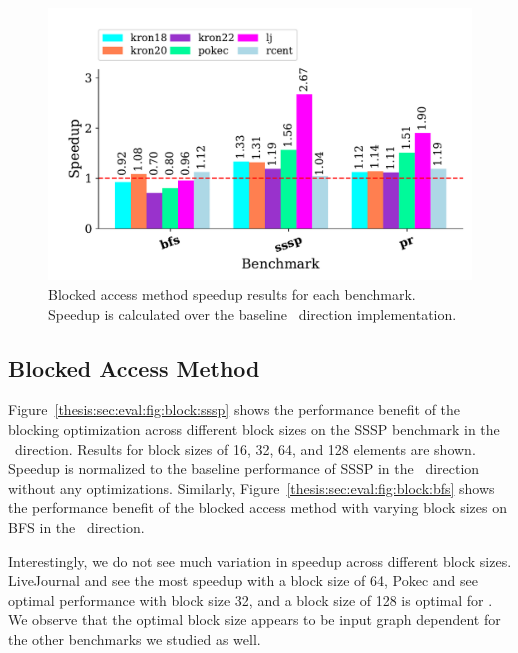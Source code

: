 \begin{figure}[!ht]
    \centering
    \includegraphics[scale = 0.65]{graphit-figures/all-blocked.pdf}
    \caption{Blocked access method speedup results for each benchmark. Speedup is calculated over the baseline \pull~direction implementation.} %
    \label{pap:generals:sec:eval:fig:blocked}
\end{figure}

\subsection{Blocked Access Method}
 
Figure~\ref{thesis:sec:eval:fig:block:sssp} shows the performance benefit of the blocking optimization across different block sizes on the SSSP benchmark in the \pull~direction. 
Results for block sizes of 16, 32, 64, and 128 elements are shown.
Speedup is normalized to the baseline performance of SSSP in the \pull~direction without any optimizations.
Similarly, Figure~\ref{thesis:sec:eval:fig:block:bfs} shows the performance benefit of the blocked access method with varying block sizes on BFS in the \pull~direction.
 
Interestingly, we do not see much variation in speedup across different block sizes. 
LiveJournal and  see the most speedup with a block size of 64, Pokec and  see optimal performance with block size 32, and a block size of 128 is optimal for . 
We observe that the optimal block size appears to be input graph dependent for the other benchmarks we studied as well. 
 
